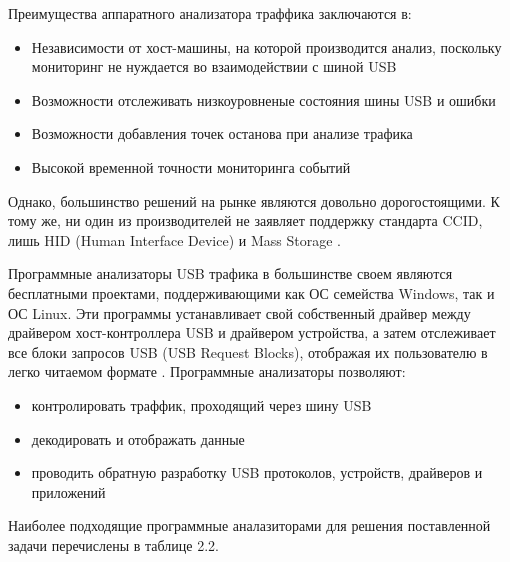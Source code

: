 Преимущества аппаратного анализатора траффика заключаются в:
\begin{itemize}
  \item Независимости от хост-машины, на которой производится анализ, поскольку мониторинг не нуждается во взаимодействии с шиной USB
  \item Возможности отслеживать низкоуровненые состояния шины USB и ошибки
  \item Возможности добавления точек останова при анализе трафика
  \item Высокой временной точности мониторинга событий
\end{itemize}

Однако, большинство решений на рынке являются довольно дорогостоящими. К тому же, ни один из производителей не заявляет поддержку
стандарта CCID, лишь HID (Human Interface Device) и Mass Storage \cite{beagle,ellisys,lecroy}.

Программные анализаторы USB трафика в большинстве своем являются бесплатными проектами, поддерживающими как ОС семейства Windows,
так и ОС Linux. Эти программы устанавливает свой собственный драйвер между драйвером хост-контроллера USB и драйвером устройства,
а затем отслеживает все блоки запросов USB (USB Request Blocks), отображая их пользователю в легко читаемом формате \cite{windows-analyzer}.
Программные анализаторы позволяют:
\begin{itemize}
  \item контролировать траффик, проходящий через шину USB
  \item декодировать и отображать данные
  \item проводить обратную разработку USB протоколов, устройств, драйверов и приложений
\end{itemize}

Наиболее подходящие программные аналазиторами для решения поставленной задачи перечислены в таблице 2.2.

\begin{table}[ht]
  \begin{center}
  \caption{Программные анализаторы}
  \end{center}
\end{table}

